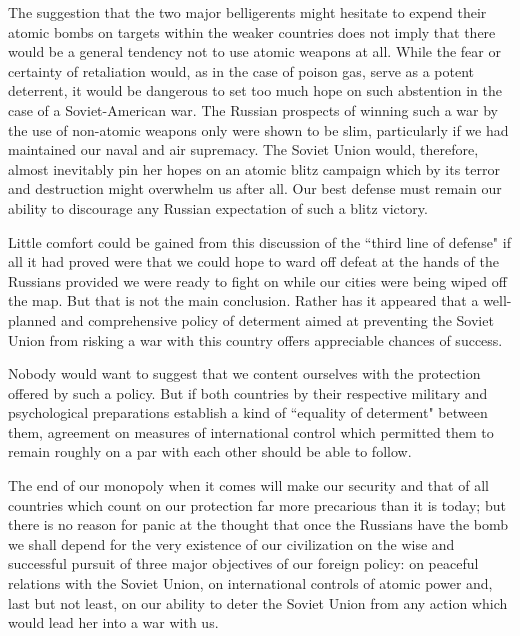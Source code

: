 The suggestion that the two major belligerents might hesitate to expend their atomic bombs on targets within the weaker countries does not imply that there would be a general tendency not to use atomic weapons at all. While the fear or certainty of retaliation would, as in the case of poison gas, serve as a potent deterrent, it would be dangerous to set too much hope on such abstention in the case of a Soviet-American war. The Russian prospects of winning such a war by the use of non-atomic weapons only were shown to be slim, particularly if we had maintained our naval and air supremacy. The Soviet Union would, therefore, almost inevitably pin her hopes on an atomic blitz campaign which by its terror and destruction might overwhelm us after all. Our best defense must remain our ability to discourage any Russian expectation of such a blitz victory.

Little comfort could be gained from this discussion of the ``third line of defense" if all it had proved were that we could hope to ward off defeat at the hands of the Russians provided we were ready to fight on while our cities were being wiped off the map. But that is not the main conclusion. Rather has it appeared that a well-planned and comprehensive policy of determent aimed at preventing the Soviet Union from risking a war with this country offers appreciable chances of success.

Nobody would want to suggest that we content ourselves with the protection offered by such a policy. But if both countries by their respective military and psychological preparations establish a kind of ``equality of determent" between them, agreement on measures of international control which permitted them to remain roughly on a par with each other should be able to follow.

The end of our monopoly when it comes will make our security and that of all countries which count on our protection far more precarious than it is today; but there is no reason for panic at the thought that once the Russians have the bomb we shall depend for the very existence of our civilization on the wise and successful pursuit of three major objectives of our foreign policy: on peaceful relations with the Soviet Union, on international controls of atomic power and, last but not least, on our ability to deter the Soviet Union from any action which would lead her into a war with us.
